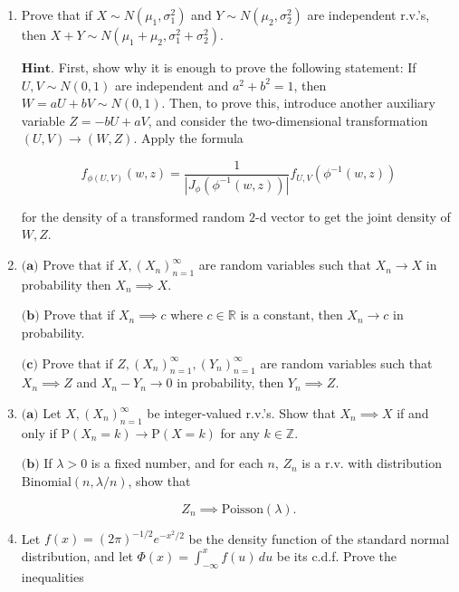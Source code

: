 \documentclass[11pt]{report}
\newcommand{\R}{\mathbb{R}}
\newcommand{\Z}{\mathbb{Z}}
\theoremstyle{plain}
\theoremstyle{definition}
\begin{document}
\begin{enumerate}[label=\arabic*.]
\[
\mathrm{P}(S_n=k) \approx \frac{1}{\sqrt{n}} \varphi(x).
\]

$\textbf{Hint.}$ Use the fact that $\log(1+u)=u-u^2/2 + O(u^3)$ as $u\to 0$.

(b) Find $\lim_{n\to\infty} e^{-n} \sum_{k=0}^n \frac{n^k}{k!}$.

(c) If $X_1,X_2,\ldots$ are i.i.d. $\textrm{Exp}(1)$ random variables and denote $S_n=\sum_{k=1}^n X_k$ (so $S_n \sim \textrm{Gamma}(n,1)$), $\hat{S}_n = (S_n-n)/\sqrt{n}$. Show that if $n$ is large and $x\in \R$ is fixed then the density of $\hat{S}_n$ satisfies

\[
f_{\hat{S}_n}(x) \approx \varphi(x).
\]
\item Prove that if $X\sim N(\mu_1, \sigma_1^2)$ and $Y\sim N(\mu_2, \sigma_2^2)$ are independent r.v.'s, then $X+Y \sim N(\mu_1+\mu_2, \sigma_1^2+\sigma_2^2)$.

$\textbf{Hint.}$ First, show why it is enough to prove the following statement: If $U,V \sim N(0,1)$ are independent and $a^2+b^2 = 1$, then $W=aU+bV \sim N(0,1)$. Then, to prove this, introduce another auxiliary variable $Z=-bU+aV$, and consider the two-dimensional transformation $(U,V)\to(W,Z)$. Apply the formula

\[
f_{\phi(U,V)}(w,z) = \frac{1}{|J_\phi(\phi^{-1}(w,z))|} f_{U,V}(\phi^{-1}(w,z))
\]

for the density of a transformed random $2$-d vector to get the joint density of $W,Z$.
\item $\textbf{(a)}$ Prove that if $X, (X_n)_{n=1}^\infty$ are random variables such that $X_n \to X$ in probability then $X_n \implies X$.

$\textbf{(b)}$ Prove that if $X_n \implies c$ where $c\in \R$ is a constant, then $X_n \to c$ in probability.

$\textbf{(c)}$ Prove that if $Z, (X_n)_{n=1}^\infty, (Y_n)_{n=1}^\infty$ are random variables such that $X_n \implies Z$ and $X_n-Y_n\to 0$ in probability, then $Y_n \implies Z$.
\item $\textbf{(a)}$ Let $X, (X_n)_{n=1}^\infty$ be integer-valued r.v.'s. Show that $X_n\implies X$ if and only if
$\mathrm{P}(X_n=k)\to \mathrm{P}(X=k)$ for any $k\in\Z$.

$\textbf{(b)}$ If $\lambda >0$ is a fixed number, and for each $n$, $Z_n$ is a r.v. with distribution $\textrm{Binomial}(n,\lambda/n)$, show that

\[
Z_n \implies \textrm{Poisson}(\lambda).
\]
\item Let $f(x) = (2\pi)^{-1/2} e^{-x^2/2}$ be the density function of the standard normal distribution, and let $\Phi(x) = \int_{-\infty}^x f(u)\,du$ be its c.d.f. Prove the inequalities


\end{enumerate}
\end{document}
